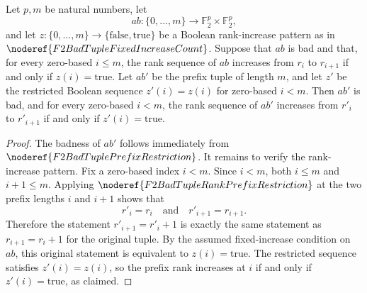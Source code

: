 \begin{helper}
Let \(p,m\) be natural numbers, let
\[
  ab:\{0,\ldots,m\}\to \mathbb F_2^p\times\mathbb F_2^p,
\]
and let \(z:\{0,\ldots,m\}\to\{\mathrm{false},\mathrm{true}\}\) be a Boolean
rank-increase pattern as in \(\noderef{F2BadTupleFixedIncreaseCount}\).
Suppose that \(ab\) is bad and that, for every zero-based \(i\le m\), the rank
sequence of \(ab\) increases from \(r_i\) to \(r_{i+1}\) if and only if
\(z(i)=\mathrm{true}\). Let \(ab'\) be the prefix tuple of length \(m\), and
let \(z'\) be the restricted Boolean sequence \(z'(i)=z(i)\) for
zero-based \(i<m\). Then \(ab'\) is bad, and for every zero-based \(i<m\), the
rank sequence of \(ab'\) increases from \(r'_i\) to \(r'_{i+1}\) if and only if
\(z'(i)=\mathrm{true}\).
\end{helper}
\begin{proof}
The badness of \(ab'\) follows immediately from
\(\noderef{F2BadTuplePrefixRestriction}\). It remains to verify the
rank-increase pattern. Fix a zero-based index \(i<m\). Since \(i<m\), both
\(i\le m\) and \(i+1\le m\). Applying
\(\noderef{F2BadTupleRankPrefixRestriction}\) at the two prefix lengths \(i\)
and \(i+1\) shows that
\[
  r'_i=r_i
  \quad\text{and}\quad
  r'_{i+1}=r_{i+1}.
\]
Therefore the statement \(r'_{i+1}=r'_i+1\) is exactly the same statement as
\(r_{i+1}=r_i+1\) for the original tuple. By the assumed fixed-increase
condition on \(ab\), this original statement is equivalent to
\(z(i)=\mathrm{true}\). The restricted sequence satisfies \(z'(i)=z(i)\), so
the prefix rank increases at \(i\) if and only if \(z'(i)=\mathrm{true}\), as
claimed.
\end{proof}
